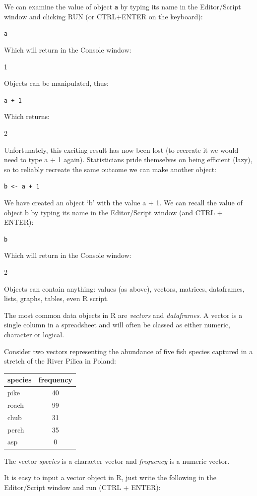 \documentclass[
]{book}
\begin{document}
We can examine the value of object \texttt{a} by typing its name in the Editor/Script window and clicking RUN (or CTRL+ENTER on the keyboard):

\texttt{a}

Which will return in the Console window:

1

Objects can be manipulated, thus:

\texttt{a\ +\ 1}

Which returns:

2

Unfortunately, this exciting result has now been lost (to recreate it we would need to type a + 1 again). Statisticians pride themselves on being efficient (lazy), so to reliably recreate the same outcome we can make another object:

\texttt{b\ \textless{}-\ a\ +\ 1}

We have created an object `b' with the value a + 1. We can recall the value of object b by typing its name in the Editor/Script window (and CTRL + ENTER):

\texttt{b}

Which will return in the Console window:

2

Objects can contain anything: values (as above), vectors, matrices, dataframes, lists, graphs, tables, even R script.

The most common data objects in R are \emph{vectors} and \emph{dataframes}. A vector is a single column in a spreadsheet and will often be classed as either numeric, character or logical.

Consider two vectors representing the abundance of five fish species captured in a stretch of the River Pilica in Poland:

\begin{longtable}[]{@{}lc@{}}
\toprule
species & frequency \\
\midrule
\endhead
pike & 40 \\
roach & 99 \\
chub & 31 \\
perch & 35 \\
asp & 0 \\
\bottomrule
\end{longtable}

The vector \emph{species} is a character vector and \emph{frequency} is a numeric vector.

It is easy to input a vector object in R, just write the following in the Editor/Script window and run (CTRL + ENTER):
\end{document}

